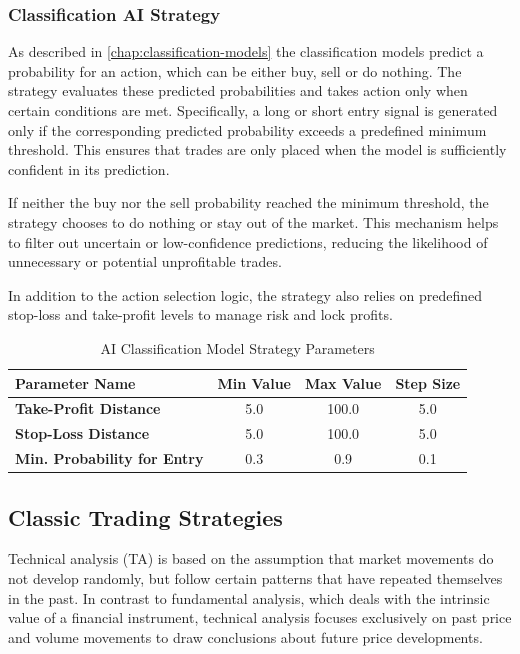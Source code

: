 \subsubsection{Classification AI Strategy}

As described in \autoref{chap:classification-models} the classification models predict a probability for an action, which can be either buy, sell or do nothing.
The strategy evaluates these predicted probabilities and takes action only when certain conditions are met.
Specifically, a long or short entry signal is generated only if the corresponding predicted probability exceeds a predefined minimum threshold.
This ensures that trades are only placed when the model is sufficiently confident in its prediction.

If neither the buy nor the sell probability reached the minimum threshold, the strategy chooses to do nothing or stay out of the market.
This mechanism helps to filter out uncertain or low-confidence predictions, reducing the likelihood of unnecessary or potential unprofitable trades.

In addition to the action selection logic, the strategy also relies on predefined stop-loss and take-profit levels to manage risk and lock profits.


\begin{table}[H]
    \centering
    \begin{tabular}{L{4cm}ccc}
        \toprule
        \textbf{Parameter Name} & Min Value & Max Value & Step Size
        \\
        \midrule
        \textbf{Take-Profit Distance}       & 5.0 & 100.0 & 5.0 \\
        \textbf{Stop-Loss Distance}         & 5.0 & 100.0 & 5.0 \\
        \textbf{Min. Probability for Entry} & 0.3 & 0.9   & 0.1 \\
        \bottomrule
    \end{tabular}
    \caption{AI Classification Model Strategy Parameters}
    \label{tbl:classification-strategy-parameters}
\end{table}

\subsection{Classic Trading Strategies}

Technical analysis (TA) is based on the assumption that market movements do not develop randomly, but follow certain patterns that have repeated themselves in the past.
In contrast to fundamental analysis, which deals with the intrinsic value of a financial instrument, technical analysis focuses exclusively on past price and volume movements to draw conclusions about future price developments.

